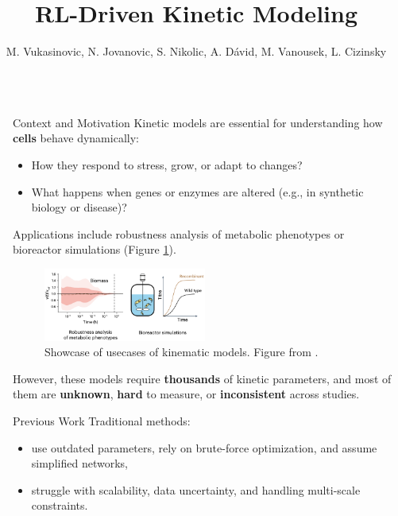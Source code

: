 \documentclass[final]{beamer}
\title{RL-Driven Kinetic Modeling}
\author{M. Vukasinovic, N. Jovanovic, S. Nikolic, A. Dávid, M. Vanousek, L. Cizinsky}
\newlength{\sepwidth}
\newlength{\colwidth}
\newcommand{\separatorcolumn}{\begin{column}{\sepwidth}\end{column}}
\begin{document}
\begin{frame}[t]
\begin{columns}[t]
\separatorcolumn

\begin{column}{\colwidth}

    \begin{block}{Context and Motivation}
    Kinetic models are essential for understanding how \textbf{cells} behave dynamically:
    \begin{itemize}
        \item How they respond to stress, grow, or adapt to changes?
        \item What happens when genes or enzymes are altered (e.g., in synthetic biology or disease)?
    \end{itemize}
 
    \vspace{0.5cm}

    Applications include robustness analysis of metabolic phenotypes or bioreactor simulations (Figure \ref{fig:applications}).

    \begin{figure}[h]
        \centering
        \includegraphics[width=0.5\textwidth]{assets/applications.png}
        \caption{Showcase of usecases of kinematic models. Figure from \cite{rennaissance}.}
        \label{fig:applications}
    \end{figure}

    However, these models require \textbf{thousands} of kinetic parameters, and most of them are \textbf{unknown}, 
    \textbf{hard} to measure, or \textbf{inconsistent} across studies.
    \end{block}

    \begin{block}{Previous Work}
        Traditional methods:
        \begin{itemize}
            \item use outdated parameters, rely on brute-force optimization, and assume simplified networks,
            \item struggle with scalability, data uncertainty, and handling multi-scale constraints.
        \end{itemize}
        

\end{block}
\end{column}
\end{columns}
\end{frame}
\end{document}
